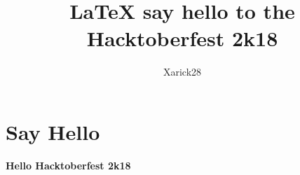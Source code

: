 \documentclass{article}
\title{LaTeX say hello to the Hacktoberfest 2k18}
\author{Xarick28}
\begin{document}
\maketitle

\section{Say Hello}
\textbf{Hello Hacktoberfest 2k18}
\end{document}
